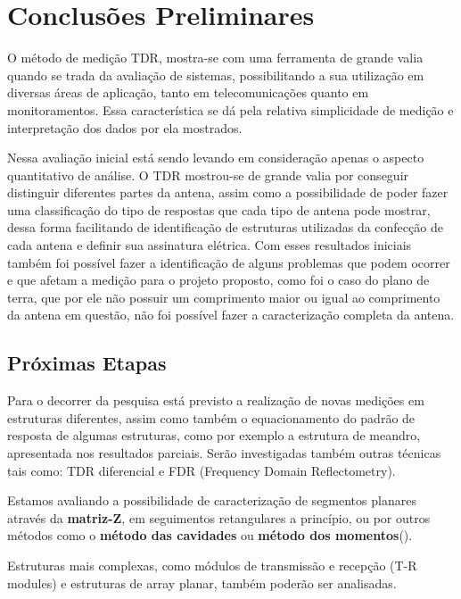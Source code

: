 \chapter*{Conclusões Preliminares}
O método de medição TDR, mostra-se com uma ferramenta de grande valia quando se trada da avaliação de sistemas, possibilitando a sua utilização em diversas áreas de aplicação, tanto em telecomunicações quanto em monitoramentos. Essa característica se dá pela relativa simplicidade de medição e interpretação dos dados por ela mostrados. 

Nessa avaliação inicial está sendo levando em consideração apenas o aspecto quantitativo de análise. O TDR mostrou-se de grande valia por conseguir distinguir diferentes partes da antena, assim como a possibilidade de poder fazer uma classificação do tipo de respostas que cada tipo de antena pode mostrar, dessa forma facilitando de identificação de estruturas utilizadas da confecção de cada antena e definir sua assinatura elétrica. Com esses resultados iniciais também foi possível fazer a identificação de alguns problemas que podem ocorrer e que afetam a medição para o projeto proposto, como foi o caso do plano de terra, que por ele não possuir um comprimento maior ou igual ao comprimento da antena em questão, não foi possível fazer a caracterização completa da antena.

\section*{Próximas Etapas}
Para o decorrer da pesquisa está previsto a realização de novas medições em estruturas diferentes, assim como também o equacionamento do padrão de resposta de algumas estruturas, como por exemplo a estrutura de meandro, apresentada nos resultados parciais. Serão investigadas também outras técnicas tais como: TDR diferencial e FDR (Frequency Domain Reflectometry).

Estamos avaliando a possibilidade de caracterização de segmentos planares através da \textbf{matriz-Z}, em seguimentos retangulares a princípio, ou por outros métodos como o \textbf{método das cavidades} ou \textbf{método dos momentos}(\cite{Gupta}).

Estruturas mais complexas, como módulos de transmissão e recepção (T-R modules) e estruturas de array planar, também poderão ser analisadas.


